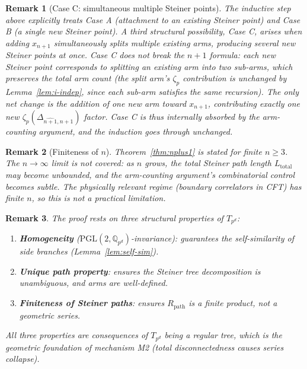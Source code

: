 \documentclass[11pt,a4paper]{article}
\newtheorem{remark}{Remark}
\newcommand{\PGL}{\mathrm{PGL}}
\begin{document}
\begin{remark}[Case C: simultaneous multiple Steiner points]
\label{rem:caseC}
The inductive step above explicitly treats Case A (attachment to an existing Steiner point) and Case B (a single new Steiner point). A third structural possibility, \emph{Case C}, arises when adding $x_{n+1}$ simultaneously splits multiple existing arms, producing several new Steiner points at once. Case C does not break the $n{+}1$ formula: each new Steiner point corresponds to splitting an existing arm into two sub-arms, which preserves the total arm count (the split arm's $\zeta_p$ contribution is unchanged by Lemma~\ref{lem:i-indep}, since each sub-arm satisfies the same recursion). The only net change is the addition of one new arm toward $x_{n+1}$, contributing exactly one new $\zeta_p(\Delta_{\widehat{n+1}, n+1})$ factor. Case C is thus internally absorbed by the arm-counting argument, and the induction goes through unchanged.
\end{remark}

\begin{remark}[Finiteness of $n$]
\label{rem:finite-n}
Theorem~\ref{thm:nplus1} is stated for finite $n \geq 3$. The $n \to \infty$ limit is not covered: as $n$ grows, the total Steiner path length $L_{\text{total}}$ may become unbounded, and the arm-counting argument's combinatorial control becomes subtle. The physically relevant regime (boundary correlators in CFT) has finite $n$, so this is not a practical limitation.
\end{remark}

\begin{remark}
The proof rests on three structural properties of $T_{p^d}$:
\begin{enumerate}[leftmargin=2em]
    \item \textbf{Homogeneity} ($\PGL(2, \mathbb{Q}_{p^d})$-invariance): guarantees the self-similarity of side branches (Lemma~\ref{lem:self-sim}).
    \item \textbf{Unique path property}: ensures the Steiner tree decomposition is unambiguous, and arms are well-defined.
    \item \textbf{Finiteness of Steiner paths}: ensures $R_{\mathrm{path}}$ is a finite product, not a geometric series.
\end{enumerate}
All three properties are consequences of $T_{p^d}$ being a regular tree, which is the geometric foundation of mechanism M2 (total disconnectedness causes series collapse).
\end{remark}
\end{document}
